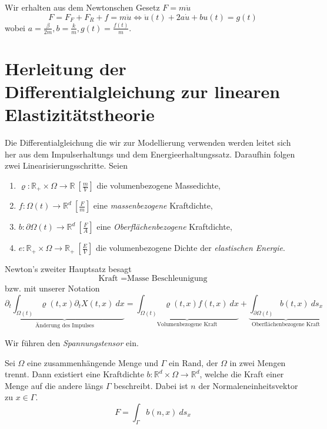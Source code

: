 Wir erhalten aus dem Newtonschen Gesetz $F= m \ddot{u}$
\begin{equation*}
	F = F_F + F_R + f = m \ddot{u} \Leftrightarrow \ddot{u}(t) + 2a \dot{u} + bu(t) = g(t)
\end{equation*}
wobei $a = \frac{\beta}{2m}, b = \frac{k}{m}, g(t)=\frac{f(t)}{m}$.

\newpage

\section{Herleitung der Differentialgleichung zur linearen Elastizitätstheorie}

Die Differentialgleichung die wir zur Modellierung verwenden werden leitet sich her aus dem Impulserhaltungs und dem Energieerhaltungssatz. Daraufhin folgen zwei Linearisierungsschritte. Seien

\begin{enumerate}[label=\roman*)]
	\item $\varrho: \mathbb{R}_+ \times \Omega \rightarrow \mathbb{R} \ [\frac{m}{V}]$ die volumenbezogene Massedichte,
	\item $f: \Omega(t) \rightarrow \mathbb{R}^d \ [\frac{F}{m}]$ eine \textit{massenbezogene} Kraftdichte,
	\item $b: \partial \Omega(t) \rightarrow \mathbb{R}^d \ [\frac{F}{A}]$ eine \textit{Oberflächenbezogene} Kraftdichte,
	\item $e: \mathbb{R}_+ \times \Omega \rightarrow \mathbb{R}_+ \ [\frac{E}{V}]$ die volumenbezogene Dichte der \textit{elastischen Energie}.
\end{enumerate}


Newton's zweiter Hauptsatz besagt
\begin{equation*}
	\text{Kraft } = \text{Masse } \text{Beschleunigung}
\end{equation*}
bzw. mit unserer Notation
\begin{equation}
	\underbrace{\partial_t \int_{\Omega(t)} \varrho(t,x) \partial_t X(t,x) \ dx}_{\text{Änderung des Impulses}} = \underbrace{\int_{\Omega(t)} \varrho(t,x) f(t,x) \ dx}_{\text{Volumenbezogene Kraft}} + \underbrace{\int_{\partial \Omega(t)} b(t,x) \ ds_x}_{\text{Oberflächenbezogene Kraft}}
\label{eq:Impulserhaltungssatz1}
\end{equation}

Wir führen den \textit{Spannungstensor} ein.
\begin{definition}\cite[p.217]{EckGarcke2017} Sei $\Omega$ eine zusammenhängende Menge und $\Gamma$ ein Rand, der $\Omega$ in zwei Mengen trennt. Dann existiert eine Kraftdichte $b: \mathbb{R}^d \times \Omega \rightarrow \mathbb{R}^d$, welche die Kraft einer Menge auf die andere längs $\Gamma$ beschreibt. Dabei ist $n$ der Normaleneinheitsvektor zu $x \in \Gamma$.
	\begin{equation}
		F = \int_{\Gamma} b(n,x) \ ds_x \label{eq: AxiomCauchy}
	\end{equation}
\end{definition}


